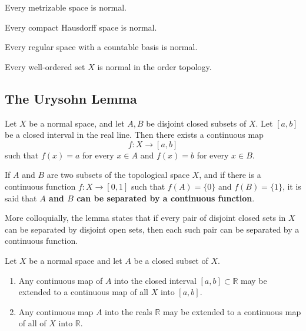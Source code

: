   \begin{theorem}
    Every metrizable space is normal. 
  \end{theorem}

  \begin{theorem}
    Every compact Hausdorff space is normal. 
  \end{theorem}

  \begin{theorem}
    Every regular space with a countable basis is normal. 
  \end{theorem}

  \begin{theorem}
    Every well-ordered set $X$ is normal in the order topology. 
  \end{theorem}

\subsection{The Urysohn Lemma}

  \begin{theorem}
    Let $X$ be a normal space, and let $A, B$ be disjoint closed subsets of $X$. Let $[a,b]$ be a closed interval in the real line. Then there exists a continuous map
    \begin{equation}
      f: X \longrightarrow [a,b]
    \end{equation}
    such that $f(x) = a$ for every $x \in A$ and $f(x) = b$ for every $x \in B$. 
  \end{theorem}

  \begin{definition}
    If $A$ and $B$ are two subsets of the topological space $X$, and if there is a continuous function $f: X \longrightarrow [0,1]$ such that $f(A) = \{0\}$ and $f(B) = \{1\}$, it is said that \textbf{$A$ and $B$ can be separated by a continuous function}. 
  \end{definition}

  More colloquially, the lemma states that if every pair of disjoint closed sets in $X$ can be separated by disjoint open sets, then each such pair can be separated by a continuous function. 

  \begin{theorem}
    Let $X$ be a normal space and let $A$ be a closed subset of $X$. 
    \begin{enumerate}
      \item Any continuous map of $A$ into the closed interval $[a,b] \subset \mathbb{R}$ may be extended to a continuous map of all $X$ into $[a,b]$. 
      \item Any continuous map $A$ into the reals $\mathbb{R}$ may be extended to a continuous map of all of $X$ into $\mathbb{R}$. 
    \end{enumerate}
  \end{theorem}

